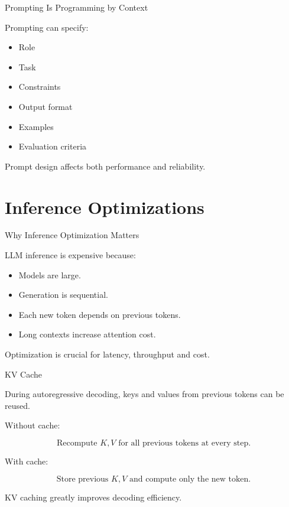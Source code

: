 \documentclass[aspectratio=169]{beamer}
\begin{document}
\begin{frame}{Prompting Is Programming by Context}

Prompting can specify:

\begin{itemize}
    \item Role
    \item Task
    \item Constraints
    \item Output format
    \item Examples
    \item Evaluation criteria
\end{itemize}

\vspace{0.4cm}

Prompt design affects both performance and reliability.

\end{frame}

\section{Inference Optimizations}

\begin{frame}{Why Inference Optimization Matters}

LLM inference is expensive because:

\begin{itemize}
    \item Models are large.
    \item Generation is sequential.
    \item Each new token depends on previous tokens.
    \item Long contexts increase attention cost.
\end{itemize}

\vspace{0.4cm}

Optimization is crucial for latency, throughput and cost.

\end{frame}

\begin{frame}{KV Cache}

During autoregressive decoding, keys and values from previous tokens can be reused.

\vspace{0.4cm}

Without cache:

\[
\text{Recompute } K,V \text{ for all previous tokens at every step.}
\]

With cache:

\[
\text{Store previous } K,V \text{ and compute only the new token.}
\]

\vspace{0.4cm}

KV caching greatly improves decoding efficiency.

\end{frame}
\end{document}
